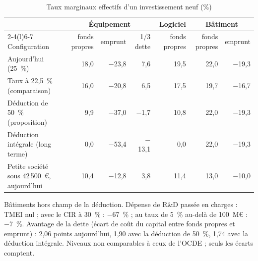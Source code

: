 \begin{table}[!htbp]\centering\scriptsize
\caption{Taux marginaux effectifs d'un investissement neuf (\%)}\label{tab:is8_tef}
\setlength{\tabcolsep}{4pt}
\begin{tabular}{@{}lrrrrrr@{}}
\toprule
& \multicolumn{3}{c}{Équipement} & Logiciel & \multicolumn{2}{c}{Bâtiment} \\
\cmidrule(lr){2-4}\cmidrule(l){6-7}
Configuration & fonds propres & emprunt & 1/3 dette & fonds propres & fonds propres & emprunt \\
\midrule
Aujourd'hui (25~\%) & 18,0 & $-$23,8 & 7,6 & 19,5 & 22,0 & $-$19,3 \\
Taux à 22,5~\% (comparaison) & 16,0 & $-$20,8 & 6,5 & 17,5 & 19,7 & $-$16,7 \\
Déduction de 50~\% (proposition) & 9,9 & $-$37,0 & $-$1,7 & 10,8 & 22,0 & $-$19,3 \\
Déduction intégrale (long terme) & 0,0 & $-$53,4 & $-$13,1 & 0,0 & 22,0 & $-$19,3 \\
Petite société sous 42\,500~€, aujourd'hui & 10,4 & $-$12,8 & 3,8 & 11,4 & 13,0 & $-$10,0 \\
\bottomrule
\end{tabular}
\par\vspace{3pt}\parbox{\linewidth}{\raggedright\scriptsize Bâtiments hors champ de la déduction. Dépense de R\&D passée
en charges : TMEI nul ; avec le CIR à 30~\% : $-$67~\% ; au taux de 5~\% au-delà de 100~M€ : $-$7~\%. Avantage de la dette (écart
de coût du capital entre fonds propres et emprunt) : 2,06 points aujourd'hui, 1,90 avec la déduction de 50~\%, 1,74 avec la
déduction intégrale. Niveaux non comparables à ceux de l'OCDE ; seuls les écarts comptent.}
\end{table}

